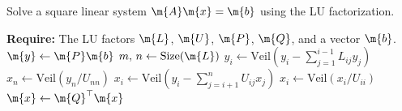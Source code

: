 \begin{breakablealgorithm}
  \caption{Solve a square linear system $\m{A}\m{x} = \m{b}$ using the \ac{LU} factorization.}
  \label{chap3:alg:solve_lu}
  \begin{algorithmic}[1]
    \State \textbf{Require:} The \ac{LU} factors $\m{L}$, $\m{U}$, $\m{P}$, $\m{Q}$, and a vector $\m{b}$.
     
    \State $\m{y} \gets \m{P}\m{b}$ 
    \State $m, \, n \gets \mathrm{Size}(\m{L})$ 
     
      \State $y_i \gets \mathrm{Veil}\left(y_i - \displaystyle\sum_{j=1}^{i-1} L_{ij}y_j \right)$ 
    \EndFor
    \State $x_n \gets \mathrm{Veil}(y_n/U_{nn})$ 
     
      \State $x_i \gets \mathrm{Veil}\left(y_i - {\displaystyle\sum_{j=i+1}^{n}} U_{ij}x_j\right)$ 
      \State $x_i \gets \mathrm{Veil}(x_i/U_{ii})$
    \EndFor
    \State $\m{x} \gets \m{Q}^\top\m{x}$ 
    \EndProcedure
  \end{algorithmic}
\end{breakablealgorithm}

